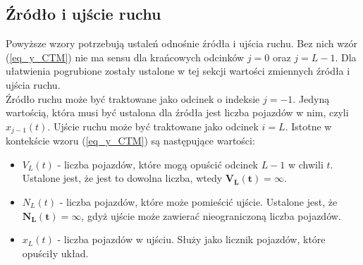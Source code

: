 \documentclass[12pt]{book}
\theoremstyle{plain}
\newcommand{\myref}[1]{(\ref{#1})}
\begin{document}
\subsection*{Źródło i ujście ruchu}
Powyższe wzory potrzebują ustaleń odnośnie źródła i ujścia ruchu. Bez nich wzór \myref{eq_y_CTM} nie ma sensu dla krańcowych odcinków $j=0$ oraz $j=L-1$. Dla ułatwienia pogrubione zostały ustalone w tej sekcji wartości zmiennych źródła i ujścia ruchu. \\ Źródło ruchu może być traktowane jako odcinek o indeksie $j=-1$. Jedyną wartością, która musi być ustalona dla źródła jest liczba pojazdów w nim, czyli $x_{j-1}(t)$. 
Ujście ruchu może być traktowane jako odcinek $i=L$. Istotne w kontekście wzoru \myref{eq_y_CTM} są następujące wartości:
\begin{itemize}
	\item $V_{L}(t)$ - liczba pojazdów, które mogą opuścić odcinek $L-1$ w chwili $t$. Ustalone jest, że jest to dowolna liczba, wtedy $\mathbf{V_{L}(t)=\infty}$.
	\item $N_{L}(t)$ - liczba pojazdów, które może pomieścić ujście. Ustalone jest, że $\mathbf{N_{L}(t)=\infty}$, gdyż ujście może zawierać nieograniczoną liczba pojazdów.
	\item $x_{L}(t)$ - liczba pojazdów w ujściu. Służy jako licznik pojazdów, które opuściły układ.
\end{itemize}
\end{document}
